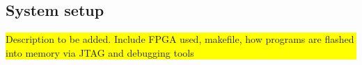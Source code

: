 \begin{colfigure}
	\label{fig:assembler}
\end{colfigure}

\subsection{System setup}\label{subsec:setup}

\colorbox{yellow}{\parbox{\columnwidth}{Description to be added. Include FPGA used, makefile, how programs are flashed into memory via JTAG and debugging tools}}




